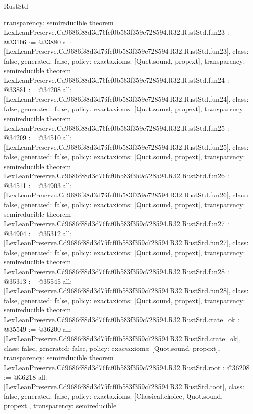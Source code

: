 \begin{lexlean}{RustStd}
\begin{coremodule}
{  transparency: semireducible
}
theorem LexLeanPreserve.Cd9686f88d3d76fcf0b583f359c728594.R32.RustStd.fun23 : @33106 := @33880 {
  all: [LexLeanPreserve.Cd9686f88d3d76fcf0b583f359c728594.R32.RustStd.fun23],
  class: false,
  generated: false,
  policy: exact{axioms: [Quot.sound, propext]},
  transparency: semireducible
}
theorem LexLeanPreserve.Cd9686f88d3d76fcf0b583f359c728594.R32.RustStd.fun24 : @33881 := @34208 {
  all: [LexLeanPreserve.Cd9686f88d3d76fcf0b583f359c728594.R32.RustStd.fun24],
  class: false,
  generated: false,
  policy: exact{axioms: [Quot.sound, propext]},
  transparency: semireducible
}
theorem LexLeanPreserve.Cd9686f88d3d76fcf0b583f359c728594.R32.RustStd.fun25 : @34209 := @34510 {
  all: [LexLeanPreserve.Cd9686f88d3d76fcf0b583f359c728594.R32.RustStd.fun25],
  class: false,
  generated: false,
  policy: exact{axioms: [Quot.sound, propext]},
  transparency: semireducible
}
theorem LexLeanPreserve.Cd9686f88d3d76fcf0b583f359c728594.R32.RustStd.fun26 : @34511 := @34903 {
  all: [LexLeanPreserve.Cd9686f88d3d76fcf0b583f359c728594.R32.RustStd.fun26],
  class: false,
  generated: false,
  policy: exact{axioms: [Quot.sound, propext]},
  transparency: semireducible
}
theorem LexLeanPreserve.Cd9686f88d3d76fcf0b583f359c728594.R32.RustStd.fun27 : @34904 := @35312 {
  all: [LexLeanPreserve.Cd9686f88d3d76fcf0b583f359c728594.R32.RustStd.fun27],
  class: false,
  generated: false,
  policy: exact{axioms: [Quot.sound, propext]},
  transparency: semireducible
}
theorem LexLeanPreserve.Cd9686f88d3d76fcf0b583f359c728594.R32.RustStd.fun28 : @35313 := @35545 {
  all: [LexLeanPreserve.Cd9686f88d3d76fcf0b583f359c728594.R32.RustStd.fun28],
  class: false,
  generated: false,
  policy: exact{axioms: [Quot.sound, propext]},
  transparency: semireducible
}
theorem LexLeanPreserve.Cd9686f88d3d76fcf0b583f359c728594.R32.RustStd.crate_ok : @35549 := @36200 {
  all: [LexLeanPreserve.Cd9686f88d3d76fcf0b583f359c728594.R32.RustStd.crate_ok],
  class: false,
  generated: false,
  policy: exact{axioms: [Quot.sound, propext]},
  transparency: semireducible
}
theorem LexLeanPreserve.Cd9686f88d3d76fcf0b583f359c728594.R32.RustStd.root : @36208 := @36218 {
  all: [LexLeanPreserve.Cd9686f88d3d76fcf0b583f359c728594.R32.RustStd.root],
  class: false,
  generated: false,
  policy: exact{axioms: [Classical.choice, Quot.sound, propext]},
  transparency: semireducible
}


\end{coremodule}
\end{lexlean}
